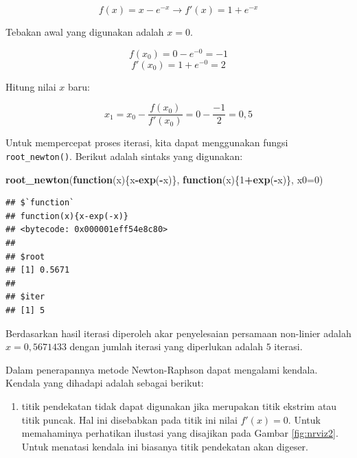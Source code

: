 \documentclass[
]{book}
\newenvironment{Shaded}{\begin{snugshade}}{\end{snugshade}}
\newcommand{\AttributeTok}[1]{\textcolor[rgb]{0.13,0.29,0.53}{#1}}
\newcommand{\ControlFlowTok}[1]{\textcolor[rgb]{0.13,0.29,0.53}{\textbf{#1}}}
\newcommand{\DecValTok}[1]{\textcolor[rgb]{0.00,0.00,0.81}{#1}}
\newcommand{\FunctionTok}[1]{\textcolor[rgb]{0.13,0.29,0.53}{\textbf{#1}}}
\newcommand{\NormalTok}[1]{#1}
\newcommand{\SpecialCharTok}[1]{\textcolor[rgb]{0.81,0.36,0.00}{\textbf{#1}}}
\providecommand{\tightlist}{%
  \setlength{\itemsep}{0pt}\setlength{\parskip}{0pt}}
\theoremstyle{definition}
\theoremstyle{definition}
\theoremstyle{definition}
\theoremstyle{definition}
\theoremstyle{remark}
\begin{document}
\[
f\left(x\right)=x-e^{-x}\to f'\left(x\right)=1+e^{-x}
\]

Tebakan awal yang digunakan adalah \(x=0\).

\[
f\left(x_0\right)=0-e^{-0}=-1
\]
\[
f'\left(x_0\right)=1+e^{-0}=2
\]

Hitung nilai \(x\) baru:

\[
x_1=x_0-\frac{f\left(x_0\right)}{f'\left(x_0\right)}=0-\frac{-1}{2}=0,5
\]

Untuk mempercepat proses iterasi, kita dapat menggunakan fungsi \texttt{root\_newton()}. Berikut adalah sintaks yang digunakan:

\begin{Shaded}
\begin{Highlighting}[]
\FunctionTok{root\_newton}\NormalTok{(}\ControlFlowTok{function}\NormalTok{(x)\{x}\SpecialCharTok{{-}}\FunctionTok{exp}\NormalTok{(}\SpecialCharTok{{-}}\NormalTok{x)\},}
            \ControlFlowTok{function}\NormalTok{(x)\{}\DecValTok{1}\SpecialCharTok{+}\FunctionTok{exp}\NormalTok{(}\SpecialCharTok{{-}}\NormalTok{x)\},}
              \AttributeTok{x0=}\DecValTok{0}\NormalTok{)}
\end{Highlighting}
\end{Shaded}

\begin{verbatim}
## $`function`
## function(x){x-exp(-x)}
## <bytecode: 0x000001eff54e8c80>
## 
## $root
## [1] 0.5671
## 
## $iter
## [1] 5
\end{verbatim}

Berdasarkan hasil iterasi diperoleh akar penyelesaian persamaan non-linier adalah \(x=0,5671433\) dengan jumlah iterasi yang diperlukan adalah \(5\) iterasi.

Dalam penerapannya metode Newton-Raphson dapat mengalami kendala. Kendala yang dihadapi adalah sebagai berikut:

\begin{enumerate}
\def\labelenumi{\arabic{enumi}.}
\tightlist
\item
  titik pendekatan tidak dapat digunakan jika merupakan titik ekstrim atau titik puncak. Hal ini disebabkan pada titik ini nilai \(f'\left(x \right)=0\). Untuk memahaminya perhatikan ilustasi yang disajikan pada Gambar \ref{fig:nrviz2}. Untuk menatasi kendala ini biasanya titik pendekatan akan digeser.
\end{enumerate}
\end{document}
